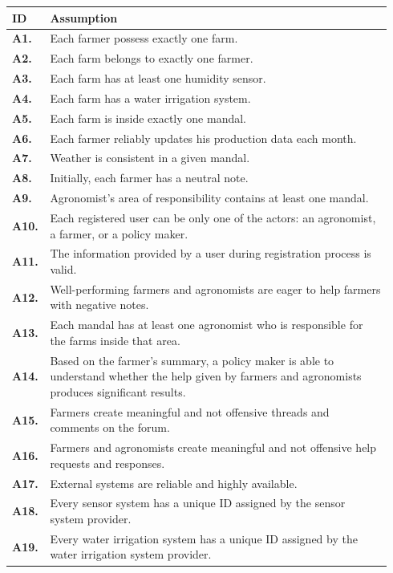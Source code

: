 \begin{longtable}{@{}p{0.06\linewidth} p{0.88\linewidth}}
	\toprule
	\textbf{ID}   & \textbf{Assumption}\\
	\midrule
    \textbf{A1.} & Each farmer possess exactly one farm.\\
    \textbf{A2.} & Each farm belongs to exactly one farmer.\\ 
    \textbf{A3.} & Each farm has at least one humidity sensor.\\ 
    \textbf{A4.} & Each farm has a water irrigation system.\\ 
    \textbf{A5.} & Each farm is inside exactly one mandal.\\ 
    \textbf{A6.} & Each farmer reliably updates his production data each month.\\ 
    \textbf{A7.} & Weather is consistent in a given mandal.\\ 
    \textbf{A8.} & Initially, each farmer has a neutral note.\\ 
    \textbf{A9.} & Agronomist's area of responsibility contains at least one mandal.\\ 
    \textbf{A10.} & Each registered user can be only one of the actors: an agronomist, a farmer, or a policy maker.\\ 
    \textbf{A11.} & The information provided by a user during registration process is valid.\\ 
    \textbf{A12.} & Well-performing farmers and agronomists are eager to help farmers with negative notes.\\ 
    \textbf{A13.} & Each mandal has at least one agronomist who is responsible for the farms inside that area.\\ 
    \textbf{A14.} & Based on the farmer's summary, a policy maker is able to understand whether the help given by farmers and agronomists produces significant results.\\ 
    \textbf{A15.} & Farmers create meaningful and not offensive threads and comments on the forum.\\ 
    \textbf{A16.} & Farmers and agronomists create meaningful and not offensive help requests and responses. \\
    \textbf{A17.} & External systems are reliable and highly available.\\
    \textbf{A18.} & Every sensor system has a unique ID assigned by the sensor system provider. \\
    \textbf{A19.} & Every water irrigation system has a unique ID assigned by the water irrigation system provider. \\
	\bottomrule
\end{longtable}
